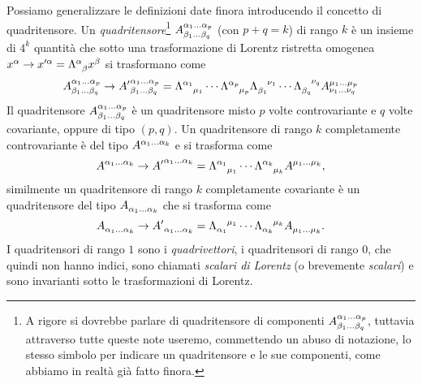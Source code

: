 Possiamo generalizzare le definizioni date finora introducendo il concetto di
quadritensore.  Un
\emph{quadritensore}\footnote{A rigore si dovrebbe parlare
  di quadritensore di componenti
  $\tensor*{A}{^{\alpha_{1}\dots\alpha_{p}}_{\beta_{1}\dots\beta_{q}}}$,
  tuttavia attraverso tutte queste note useremo, commettendo un abuso di
  notazione, lo stesso simbolo per indicare un quadritensore e le sue
  componenti, come abbiamo in realtà già fatto finora.}
$\tensor*{A}{^{\alpha_{1}\dots\alpha_{p}}_{\beta_{1}\dots\beta_{q}}}$ (con
$p + q = k$) di rango $k$ è un insieme di $4^{k}$ quantità che sotto una
trasformazione di Lorentz ristretta omogenea
$x^{\alpha} \to x'^{\alpha} = \tensor{\Lambda}{^{\alpha}_{\beta}}x^{\beta}$ si
trasformano come
\begin{equation}
  \tensor*{A}{^{\alpha_{1}\dots\alpha_{p}}_{\beta_{1}\dots\beta_{q}}} \to
  \tensor*{{A'}}{^{\alpha_{1}\dots\alpha_{p}}_{\beta_{1}\dots\beta_{q}}} =
  \tensor{\Lambda}{^{\alpha_{1}}_{\mu_{1}}} \cdots
  \tensor{\Lambda}{^{\alpha_{p}}_{\mu_{p}}}
  \tensor{\Lambda}{_{\beta_{1}}^{\nu_{1}}} \cdots
  \tensor{\Lambda}{_{\beta_{q}}^{\nu_{q}}}
  \tensor*{A}{^{\mu_{1}\dots\mu_{p}}_{\nu_{1}\dots\nu_{q}}}
\end{equation}
Il quadritensore
$\tensor*{A}{^{\alpha_{1}\dots\alpha_{p}}_{\beta_{1}\dots\beta_{q}}}$ è un
quadritensore misto $p$ volte controvariante e $q$ volte covariante, oppure di
tipo $(p,q)$.  Un quadritensore di rango $k$ completamente controvariante è del
tipo $\tensor{A}{^{\alpha_{1}\dots\alpha_{k}}}$ e si trasforma come
\begin{equation}
  \tensor{A}{^{\alpha_{1}\dots\alpha_{k}}} \to
  \tensor{{A'}}{^{\alpha_{1}\dots\alpha_{k}}} =
  \tensor{\Lambda}{^{\alpha_{1}}_{\mu_{1}}} \cdots
  \tensor{\Lambda}{^{\alpha_{k}}_{\mu_{k}}} \tensor{A}{^{\mu_{1}\dots\mu_{k}}},
\end{equation}
similmente un quadritensore di rango $k$ completamente covariante è un
quadritensore del tipo $\tensor{A}{_{\alpha_{1}\dots\alpha_{k}}}$ che si
trasforma come
\begin{equation}
  \tensor{A}{_{\alpha_{1}\dots\alpha_{k}}} \to
  \tensor{{A'}}{_{\alpha_{1}\dots\alpha_{k}}} =
  \tensor{\Lambda}{_{\alpha_{1}}^{\mu_{1}}} \cdots
  \tensor{\Lambda}{_{\alpha_{k}}^{\mu_{k}}} \tensor{A}{_{\mu_{1}\dots\mu_{k}}}.
\end{equation}
I quadritensori di rango $1$ sono i \emph{quadrivettori}, i
quadritensori di rango $0$, che quindi non hanno indici, sono chiamati
\emph{scalari di Lorentz} (o brevemente \emph{scalari}) e sono
invarianti sotto le trasformazioni di Lorentz.

